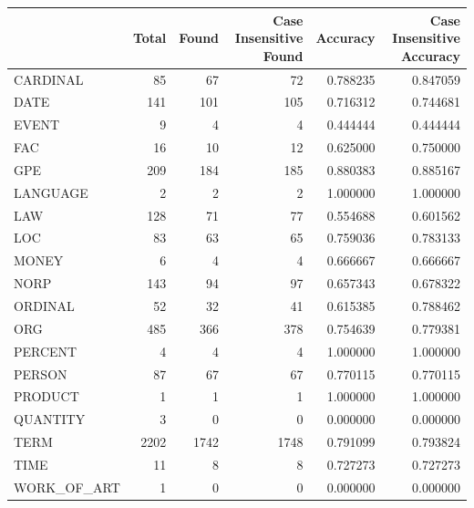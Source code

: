 \begin{tabular}{lrrrrr}
\toprule
 & Total & Found & Case Insensitive Found & Accuracy & Case Insensitive Accuracy \\
\midrule
CARDINAL & 85 & 67 & 72 & 0.788235 & 0.847059 \\
DATE & 141 & 101 & 105 & 0.716312 & 0.744681 \\
EVENT & 9 & 4 & 4 & 0.444444 & 0.444444 \\
FAC & 16 & 10 & 12 & 0.625000 & 0.750000 \\
GPE & 209 & 184 & 185 & 0.880383 & 0.885167 \\
LANGUAGE & 2 & 2 & 2 & 1.000000 & 1.000000 \\
LAW & 128 & 71 & 77 & 0.554688 & 0.601562 \\
LOC & 83 & 63 & 65 & 0.759036 & 0.783133 \\
MONEY & 6 & 4 & 4 & 0.666667 & 0.666667 \\
NORP & 143 & 94 & 97 & 0.657343 & 0.678322 \\
ORDINAL & 52 & 32 & 41 & 0.615385 & 0.788462 \\
ORG & 485 & 366 & 378 & 0.754639 & 0.779381 \\
PERCENT & 4 & 4 & 4 & 1.000000 & 1.000000 \\
PERSON & 87 & 67 & 67 & 0.770115 & 0.770115 \\
PRODUCT & 1 & 1 & 1 & 1.000000 & 1.000000 \\
QUANTITY & 3 & 0 & 0 & 0.000000 & 0.000000 \\
TERM & 2202 & 1742 & 1748 & 0.791099 & 0.793824 \\
TIME & 11 & 8 & 8 & 0.727273 & 0.727273 \\
WORK_OF_ART & 1 & 0 & 0 & 0.000000 & 0.000000 \\
\bottomrule
\end{tabular}
